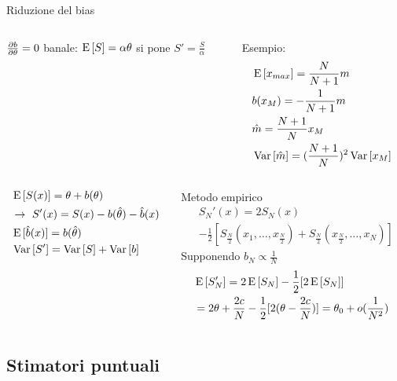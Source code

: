 \begin{frame}{Riduzione del bias}
\begin{columns}[T]
\begin{column}{0.5\textwidth}
$\frac{\partial b}{\partial \theta}=0$ banale: $\operatorname{E}{[S]}=\alpha\theta$ si pone $S'=\frac{S}{\alpha}$
\end{column}
\begin{column}{0.5\textwidth}
Esempio:
\begin{align*}
&\operatorname{E}{[x_{max}]}=\frac{N}{N+1}m\\
&b(x_M)=-\frac{1}{N+1}m\\
&\hat{m}=\frac{N+1}{N}x_M\\
&\operatorname{Var}{[\hat{m}]}=(\frac{N+1}{N})^2\operatorname{Var}{[x_M]}
\end{align*}
\end{column}
\end{columns}
\begin{columns}[T]
\begin{column}{0.5\textwidth}
\begin{align*}
&\operatorname{E}{[S(x)]}=\theta+b(\theta)\\
&\to\ S'(x)=S(x)-b(\hat{\theta})-\hat{b}(x)\\
&\operatorname{E}{[\hat{b}(x)]}=b(\hat{\theta})\\
&\operatorname{Var}{[S']}=\operatorname{Var}{[S]}+\operatorname{Var}{[b]}
\end{align*}
\end{column}
\begin{column}{0.5\textwidth}
Metodo empirico
\begin{align*}
&S_N'(x)=2S_N(x)\\
&-\frac{1}{2}[S_{\frac{N}{2}}(x_1,\ldots,x_{\frac{N}{2}})+S_{\frac{N}{2}}(x_{\frac{N}{2}},\ldots,x_N)]
\end{align*}
Supponendo $b_N\propto\frac{1}{N}$
\begin{align*}
&\operatorname{E}{[S_N']}=2\operatorname{E}{[S_N]}-\frac{1}{2}[2\operatorname{E}{[S_N]}]\\
&=2\theta+\frac{2c}{N}-\frac{1}{2}[2(\theta-\frac{2c}{N})]=\theta_0+o(\frac{1}{N^2})
\end{align*}
\end{column}
\end{columns}

\end{frame}

\subsection{Stimatori puntuali}

